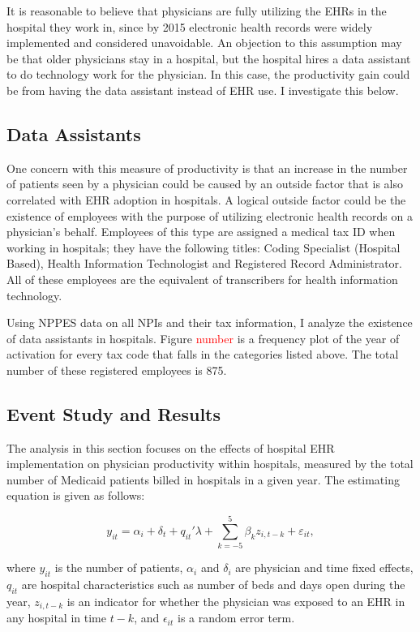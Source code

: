 \documentclass[11pt]{article}
\begin{document}
It is reasonable to believe that physicians are fully utilizing the EHRs in the hospital they work in, since by 2015 electronic health records were widely implemented and considered unavoidable. An objection to this assumption may be that older physicians stay in a hospital, but the hospital hires a data assistant to do technology work for the physician. In this case, the productivity gain could be from having the data assistant instead of EHR use. I investigate this below.

\subsection{Data Assistants}

One concern with this measure of productivity is that an increase in the number of patients seen by a physician could be caused by an outside factor that is also correlated with EHR adoption in hospitals. A logical outside factor could be the existence of employees with the purpose of utilizing electronic health records on a physician's behalf. Employees of this type are assigned a medical tax ID when working in hospitals; they have the following titles: Coding Specialist (Hospital Based), Health Information Technologist and Registered Record Administrator. All of these employees are the equivalent of transcribers for health information technology. 

Using NPPES data on all NPIs and their tax information, I analyze the existence of data assistants in hospitals. Figure \textcolor{red}{number} is a frequency plot of the year of activation for every tax code that falls in the categories listed above. The total number of these registered employees is 875. 


\subsection{Event Study and Results}

The analysis in this section focuses on the effects of hospital EHR implementation on physician productivity within hospitals, measured by the total number of Medicaid patients billed in hospitals in a given year. The estimating equation is given as follows: 

\begin{equation*}
    y_{it}=\alpha_i+\delta_t+q_{it}'\lambda+\sum_{k=-5}^5 \beta_kz_{i,t-k} + \varepsilon_{it},
\end{equation*}

where $y_{it}$ is the number of patients, $\alpha_i$ and $\delta_i$ are physician and time fixed effects, $q_{it}$ are hospital characteristics such as number of beds and days open during the year, $z_{i,t-k}$ is an indicator for whether the physician was exposed to an EHR in any hospital in time $t-k$, and $\epsilon_{it}$ is a random error term. 
\end{document}
